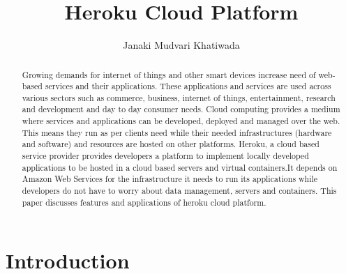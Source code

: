 
\title{Heroku Cloud Platform}


\author{Janaki Mudvari Khatiwada}


\renewcommand{\shortauthors}{J. M. Khatiwada}


\begin{abstract}
Growing demands for internet of things and other smart devices increase
need of web-based services and their applications. These applications and
services are  used across various sectors such as commerce, business, 
internet of things, entertainment, research and development and day to day 
consumer needs. Cloud computing provides a medium where services and 
applications can be developed, deployed and managed over the web.
This means they run as per clients need while their needed infrastructures 
(hardware and software) and resources are hosted on other platforms. Heroku,
 a cloud based service provider provides developers a platform to implement 
locally developed applications to be hosted in a cloud based servers and 
virtual containers.It depends on Amazon Web Services for the infrastructure 
it needs to run its applications while developers do not have to worry about
 data management, servers and containers. This paper discusses features and
 applications of heroku cloud platform.
\end{abstract}



\maketitle



\section{Introduction}

